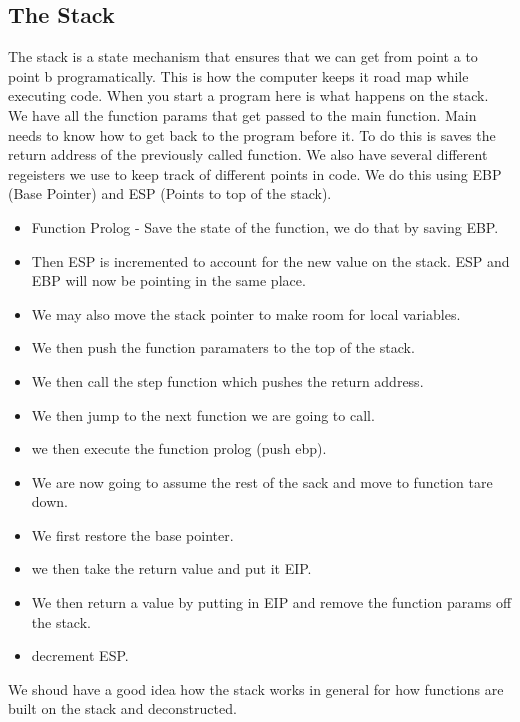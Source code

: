 \documentclass[letterpaper, onecolumn,10pt]{IEEEtran}
\begin{document}
		   \subsection{The Stack}
		   The stack is a state mechanism that ensures that we can get from point a to point b programatically. This is how the computer keeps it road map while executing code. When you start a program here is what happens on the stack. We have all the function params that get passed to the main function. Main needs to know how to get back to the program before it. To do this is saves the return address of the previously called function. We also have several different regeisters we use to keep track of different points in code. We do this using EBP (Base Pointer) and ESP (Points to top of the stack). 
		   \begin{itemize}
		       \item Function Prolog - Save the state of the function, we do that by saving EBP.\\
		       \item Then ESP is incremented to account for the new value on the stack. ESP and EBP will now be pointing in the same place.\\
		       \item We may also move the stack pointer to make room for local variables.\\
		       \item We then push the function paramaters to the top of the stack.\\
		       \item We then call the step function which pushes the return address.\\
		       \item We then jump to the next function we are going to call.\\
		       \item we then execute the function prolog (push ebp).\\
		       \item We are now going to assume the rest of the sack and move to function tare down.\\
		       \item We first restore the base pointer.
		       \item we then take the return value and put it EIP.\\
		       \item We then return a value by putting in EIP and remove the function params off the stack.\\
		       \item decrement ESP.\\
		   \end{itemize}
		   We shoud have a good idea how the stack works in general for how functions are built on the stack and deconstructed.
		   
\end{document}
